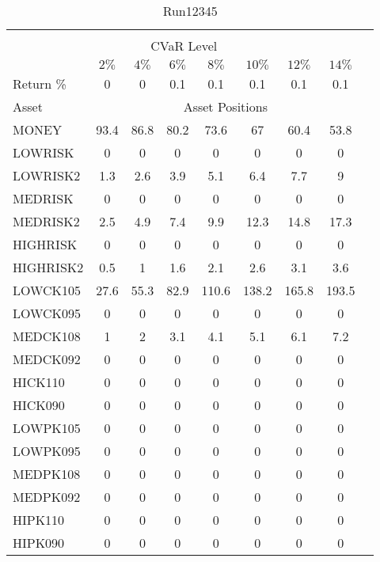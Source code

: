\begin{table}[h!t]
\caption{Run12345}
\centering
\begin{tabular}[t]{ l c c c c c c c c }
\hline\hline \\
\multicolumn{8}{c}{CVaR Level} \\
 & $2\%$ & $4\%$ & $6\%$ & $8\%$ & $10\%$ & $12\%$ & $14\%$ \\[0.5ex]
Return \% &0 &0 &0.1 &0.1 &0.1 &0.1 &0.1\\[0.5ex]
Asset & \multicolumn{7}{c}{Asset Positions} \\[1ex]
MONEY & 93.4 & 86.8 & 80.2 & 73.6 & 67 & 60.4 & 53.8\\
LOWRISK & 0 & 0 & 0 & 0 & 0 & 0 & 0\\
LOWRISK2 & 1.3 & 2.6 & 3.9 & 5.1 & 6.4 & 7.7 & 9\\
MEDRISK & 0 & 0 & 0 & 0 & 0 & 0 & 0\\
MEDRISK2 & 2.5 & 4.9 & 7.4 & 9.9 & 12.3 & 14.8 & 17.3\\
HIGHRISK & 0 & 0 & 0 & 0 & 0 & 0 & 0\\
HIGHRISK2 & 0.5 & 1 & 1.6 & 2.1 & 2.6 & 3.1 & 3.6\\
LOWCK105 & 27.6 & 55.3 & 82.9 & 110.6 & 138.2 & 165.8 & 193.5\\
LOWCK095 & 0 & 0 & 0 & 0 & 0 & 0 & 0\\
MEDCK108 & 1 & 2 & 3.1 & 4.1 & 5.1 & 6.1 & 7.2\\
MEDCK092 & 0 & 0 & 0 & 0 & 0 & 0 & 0\\
HICK110 & 0 & 0 & 0 & 0 & 0 & 0 & 0\\
HICK090 & 0 & 0 & 0 & 0 & 0 & 0 & 0\\
LOWPK105 & 0 & 0 & 0 & 0 & 0 & 0 & 0\\
LOWPK095 & 0 & 0 & 0 & 0 & 0 & 0 & 0\\
MEDPK108 & 0 & 0 & 0 & 0 & 0 & 0 & 0\\
MEDPK092 & 0 & 0 & 0 & 0 & 0 & 0 & 0\\
HIPK110 & 0 & 0 & 0 & 0 & 0 & 0 & 0\\
HIPK090 & 0 & 0 & 0 & 0 & 0 & 0 & 0\\
[1ex] \hline
\end{tabular}
\end{table} 